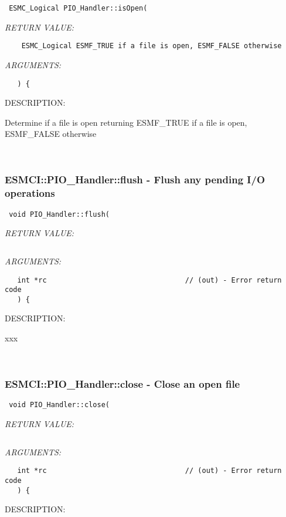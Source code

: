  
\begin{verbatim} ESMC_Logical PIO_Handler::isOpen(\end{verbatim}{\em RETURN VALUE:}
\begin{verbatim}    ESMC_Logical ESMF_TRUE if a file is open, ESMF_FALSE otherwise\end{verbatim}{\em ARGUMENTS:}
\begin{verbatim}   ) {\end{verbatim}
{\sf DESCRIPTION:\\ }


      Determine if a file is open returning ESMF_TRUE if a file is open,
      ESMF_FALSE otherwise
   
 
\mbox{}\hrulefill\
 
\subsubsection [ESMCI::PIO\_Handler::flush] {ESMCI::PIO\_Handler::flush - Flush any pending I/O operations}


  
\begin{verbatim} void PIO_Handler::flush(\end{verbatim}{\em RETURN VALUE:}
\begin{verbatim}      \end{verbatim}{\em ARGUMENTS:}
\begin{verbatim}   int *rc                                 // (out) - Error return code
   ) {\end{verbatim}
{\sf DESCRIPTION:\\ }


      xxx
   
 
\mbox{}\hrulefill\
 
\subsubsection [ESMCI::PIO\_Handler::close] {ESMCI::PIO\_Handler::close - Close an open file}


  
\begin{verbatim} void PIO_Handler::close(\end{verbatim}{\em RETURN VALUE:}
\begin{verbatim}      \end{verbatim}{\em ARGUMENTS:}
\begin{verbatim}   int *rc                                 // (out) - Error return code
   ) {\end{verbatim}
{\sf DESCRIPTION:\\ }


